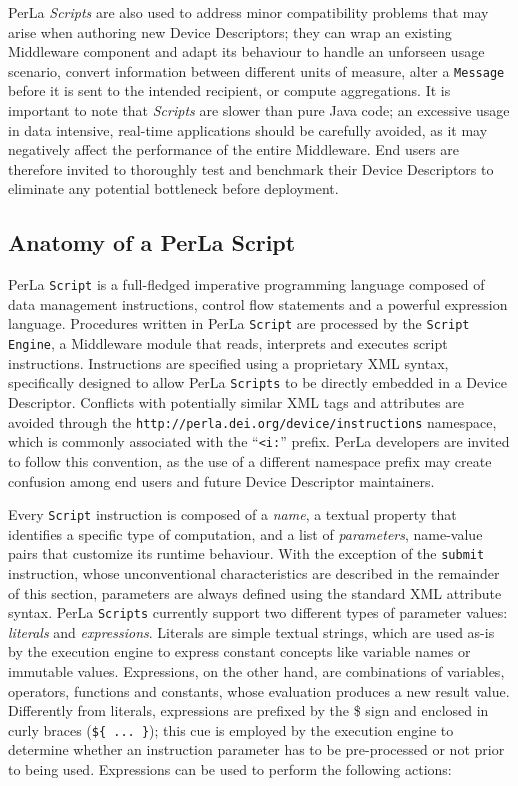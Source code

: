 PerLa \textit{Scripts} are also used to address minor compatibility problems
that may arise when authoring new Device Descriptors; they can wrap an existing
Middleware component and adapt its behaviour to handle an unforseen usage
scenario, convert information between different units of measure, alter a
\texttt{Message} before it is sent to the intended recipient, or compute
aggregations. It is important to note that \textit{Scripts} are slower than
pure Java code; an excessive usage in data intensive, real-time applications
should be carefully avoided, as it may negatively affect the performance of the
entire Middleware. End users are therefore invited to thoroughly test and
benchmark their Device Descriptors to eliminate any potential bottleneck before
deployment.


\subsection{Anatomy of a PerLa Script}

PerLa \texttt{Script} is a full-fledged imperative programming language
composed of data management instructions, control flow statements and a
powerful expression language. Procedures written in PerLa \texttt{Script} are
processed by the \texttt{Script Engine}, a Middleware module that reads,
interprets and executes script instructions. Instructions are specified using a
proprietary XML syntax, specifically designed to allow PerLa \texttt{Scripts}
to be directly embedded in a Device Descriptor. Conflicts with potentially
similar XML tags and attributes are avoided through the
\texttt{http://perla.dei.org/device/instructions} namespace, which is commonly
associated with the ``\texttt{<i:}'' prefix. PerLa developers are invited to
follow this convention, as the use of a different namespace prefix may create
confusion among end users and future Device Descriptor maintainers. 

Every \texttt{Script} instruction is composed of a \textit{name}, a textual
property that identifies a specific type of computation, and a list of
\textit{parameters}, name-value pairs that customize its runtime behaviour.
With the exception of the \texttt{submit} instruction, whose unconventional
characteristics are described in the remainder of this section, parameters are
always defined using the standard XML attribute syntax.  PerLa \texttt{Scripts}
currently support two different types of parameter values: \textit{literals}
and \textit{expressions}. Literals are simple textual strings, which are used
as-is by the execution engine to express constant concepts like variable names
or immutable values. Expressions, on the other hand, are combinations of
variables, operators, functions and constants, whose evaluation produces a new
result value. Differently from literals, expressions are prefixed by the \$
sign and enclosed in curly braces (\lstinline!${ ... }!); this cue is employed
by the execution engine to determine whether an instruction parameter has to be
pre-processed or not prior to being used.  Expressions can be used to perform
the following actions:


